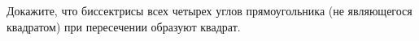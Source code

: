 \begin{ex}
	\begin{condition}
		Докажите, что биссектрисы всех четырех углов прямоугольника (не являющегося квадратом) при пересечении образуют квадрат.
	\end{condition}
\end{ex}